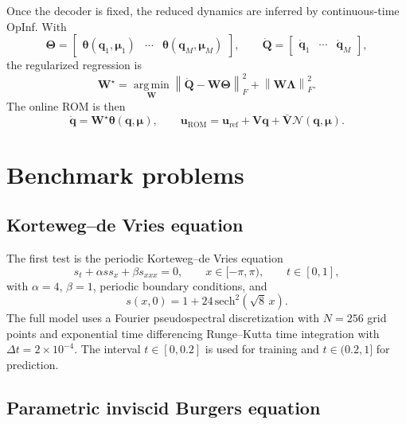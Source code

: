 \documentclass[11pt]{article}
\newcommand{\bu}{\mathbf u}
\newcommand{\bq}{\boldsymbol q}
\newcommand{\bmu}{\boldsymbol\mu}
\newcommand{\btheta}{\boldsymbol\theta}
\newcommand{\bTheta}{\boldsymbol\Theta}
\newcommand{\bdotQ}{\dot{\mathbf Q}}
\newcommand{\bV}{\mathbf V}
\newcommand{\bVbar}{\bar{\mathbf V}}
\newcommand{\bW}{\mathbf W}
\newcommand{\bLambda}{\boldsymbol\Lambda}
\newcommand{\uref}{\mathbf u_{\mathrm{ref}}}
\newcommand{\Nmap}{\mathcal{N}}
\newcommand{\argmin}{\operatorname*{arg\,min}}
\begin{document}
Once the decoder is fixed, the reduced dynamics are inferred by continuous-time
OpInf.  With
\[
  \bTheta=
  \begin{bmatrix}
  \btheta(\bq_1,\bmu_1)&\cdots&\btheta(\bq_M,\bmu_M)
  \end{bmatrix},
  \qquad
  \bdotQ=
  \begin{bmatrix}
  \dot{\bq}_1&\cdots&\dot{\bq}_M
  \end{bmatrix},
\]
the regularized regression is
\begin{equation}
  \bW^\star
  =
  \argmin_{\bW}
  \left\|
  \bdotQ-\bW\bTheta
  \right\|_F^2
  +
  \left\|
  \bW\bLambda
  \right\|_F^2.
  \label{eq:opinf_fit}
\end{equation}
The online ROM is then
\begin{equation}
  \dot{\bq}=\bW^\star\btheta(\bq,\bmu),
  \qquad
  \bu_{\mathrm{ROM}}=\uref+\bV\bq+\bVbar\Nmap(\bq,\bmu).
  \label{eq:rom}
\end{equation}

\section{Benchmark problems}
\label{sec:benchmarks}

\subsection{Korteweg--de Vries equation}

The first test is the periodic Korteweg--de Vries equation
\begin{equation}
  s_t+\alpha s s_x+\beta s_{xxx}=0,
  \qquad x\in[-\pi,\pi),\qquad t\in[0,1],
  \label{eq:kdv}
\end{equation}
with $\alpha=4$, $\beta=1$, periodic boundary conditions, and
\[
  s(x,0)=1+24\,\mathrm{sech}^2(\sqrt{8}\,x).
\]
The full model uses a Fourier pseudospectral discretization with $N=256$ grid
points and exponential time differencing Runge--Kutta time integration with
$\Delta t=2\times10^{-4}$.  The interval $t\in[0,0.2]$ is used for training and
$t\in(0.2,1]$ for prediction.

\subsection{Parametric inviscid Burgers equation}
\end{document}
